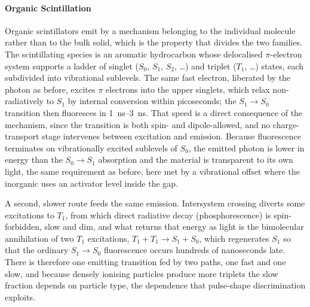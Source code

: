 \clearpage

\paragraph{Organic Scintillation}
Organic scintillators emit by a mechanism belonging to the individual molecule rather than to the bulk solid, which is the property that divides the two families.
The scintillating species is an aromatic hydrocarbon whose delocalised $\pi$-electron system supports a ladder of singlet ($S_0$, $S_1$, $S_2$, \dots) and triplet ($T_1$, \dots) states, each subdivided into vibrational sublevels.
The same fast electron, liberated by the  photon as before, excites $\pi$ electrons into the upper singlets, which relax non-radiatively to $S_1$ by internal conversion within picoseconds; the $S_1 \rightarrow S_0$ transition then fluoresces in \qtyrange{1}{3}{\nano\second}.
That speed is a direct consequence of the mechanism, since the transition is both spin- and dipole-allowed, and no charge-transport stage intervenes between excitation and emission.
Because fluorescence terminates on vibrationally excited sublevels of $S_0$, the emitted photon is lower in energy than the $S_0 \rightarrow S_1$ absorption and the material is transparent to its own light, the same requirement as before, here met by a vibrational offset where the inorganic uses an activator level inside the gap.

A second, slower route feeds the same emission.
Intersystem crossing diverts some excitations to $T_1$, from which direct radiative decay (phosphorescence) is spin-forbidden, slow and dim, and what returns that energy as light is the bimolecular annihilation of two $T_1$ excitations, $T_1 + T_1 \rightarrow S_1 + S_0$, which regenerates $S_1$ so that the ordinary $S_1 \rightarrow S_0$ fluorescence occurs hundreds of nanoseconds late.
There is therefore one emitting transition fed by two paths, one fast and one slow, and because densely ionising particles produce more triplets the slow fraction depends on particle type, the dependence that pulse-shape discrimination exploits.

